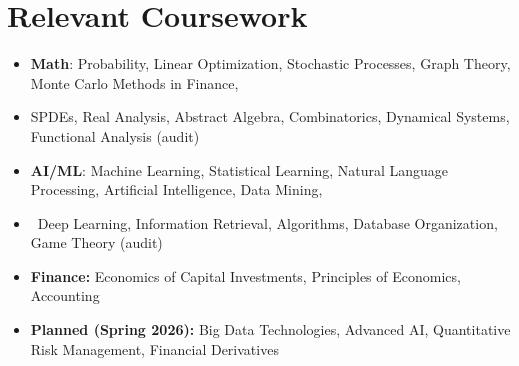 \documentclass[letterpaper,10pt]{article}
\newcommand\vspacesize{-10pt}
\newcommand{\resumeSubHeadingListStart}{\begin{itemize}[leftmargin=0.15in, label=]}
\newcommand{\resumeSubHeadingListEnd}{\end{itemize}}
\begin{document}
\vspace{\vspacesize}

\section{Relevant Coursework}
\resumeSubHeadingListStart
    \item \textbf{Math}: Probability, Linear Optimization, Stochastic Processes, Graph Theory, Monte Carlo Methods in Finance, \vspace{-5pt}
    \item \qquad\quad\;\! SPDEs, Real Analysis, Abstract Algebra, Combinatorics, Dynamical Systems, Functional Analysis (audit) \vspace{-5pt}
    \item \textbf{AI/ML}: Machine Learning, Statistical Learning, Natural Language Processing, Artificial Intelligence, Data Mining, \vspace{-5pt}
    \item \qquad\qquad\ Deep Learning, Information Retrieval, Algorithms, Database Organization, Game Theory (audit) \vspace{-5pt}
    \item \textbf{Finance:} Economics of Capital Investments, Principles of Economics, Accounting \vspace{-5pt}
    \item \textbf{Planned (Spring 2026):} Big Data Technologies, Advanced AI, Quantitative Risk Management, Financial Derivatives \vspace{-5pt}
\resumeSubHeadingListEnd
\vspace{-5pt}

\newcommand{\experienceSubheading}[2]{
    \item\vspace{-2pt}
    \begin{tabular*}{0.97\textwidth}[t]{l@{\extracolsep{\fill}}r}
      \textbf{#1} & #2
    \end{tabular*} \vspace{-5pt}
}
\newcommand{\experienceSubsubheading}[2]{
    \item\vspace{-2pt}
    \begin{tabular*}{0.97\textwidth}[t]{l@{\extracolsep{\fill}}r}
      \textit{#1} & #2 \\
    \end{tabular*}
}
\end{document}
